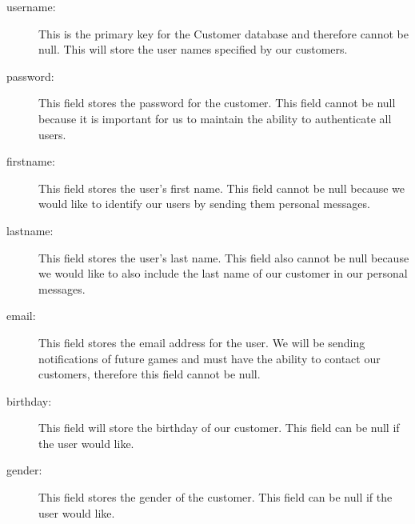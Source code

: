 \begin{description}
				\item[username:] This is the primary key for the Customer database and therefore cannot be null. This will store the user names specified by our customers.
				\item[password:] This field stores the password for the customer. This field cannot be null because it is important for us to maintain the ability to authenticate all users.
				\item[firstname:] This field stores the user's first name. This field cannot be null because we would like to identify our users by sending them personal messages.
				\item[lastname:] This field stores the user's last name. This field also cannot be null because we would like to also include the last name of our customer in our personal messages.
				\item[email:] This field stores the email address for the user. We will be sending notifications of future games and must have the ability to contact our customers, therefore this field cannot be null.
				\item[birthday:] This field will store the birthday of our customer. This field can be null if the user would like.
				\item[gender:] This field stores the gender of the customer. This field can be null if the user would like.
			\end{description}

